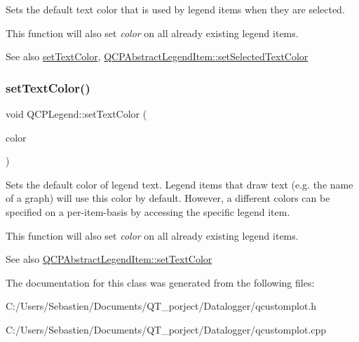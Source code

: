 Sets the default text color that is used by legend items when they are selected.

This function will also set {\itshape color} on all already existing legend items.

\begin{DoxySeeAlso}{See also}
\hyperlink{class_q_c_p_legend_ae1eb239ff4a4632fe1b6c3e668d845c6}{set\+Text\+Color}, \hyperlink{class_q_c_p_abstract_legend_item_a4d01d008ee1a5bfe9905b0397a421936}{Q\+C\+P\+Abstract\+Legend\+Item\+::set\+Selected\+Text\+Color} 
\end{DoxySeeAlso}
\mbox{\label{class_q_c_p_legend_ae1eb239ff4a4632fe1b6c3e668d845c6}} 
\subsubsection{\texorpdfstring{set\+Text\+Color()}{setTextColor()}}
{\footnotesize\ttfamily void Q\+C\+P\+Legend\+::set\+Text\+Color (\begin{DoxyParamCaption}\item[{const Q\+Color \&}]{color }\end{DoxyParamCaption})}

Sets the default color of legend text. Legend items that draw text (e.\+g. the name of a graph) will use this color by default. However, a different colors can be specified on a per-\/item-\/basis by accessing the specific legend item.

This function will also set {\itshape color} on all already existing legend items.

\begin{DoxySeeAlso}{See also}
\hyperlink{class_q_c_p_abstract_legend_item_a6ebace6aaffaedcdab2d74e88acc2d1e}{Q\+C\+P\+Abstract\+Legend\+Item\+::set\+Text\+Color} 
\end{DoxySeeAlso}


The documentation for this class was generated from the following files\+:\begin{DoxyCompactItemize}
\item 
C\+:/\+Users/\+Sebastien/\+Documents/\+Q\+T\+\_\+porject/\+Datalogger/qcustomplot.\+h\item 
C\+:/\+Users/\+Sebastien/\+Documents/\+Q\+T\+\_\+porject/\+Datalogger/qcustomplot.\+cpp\end{DoxyCompactItemize}
